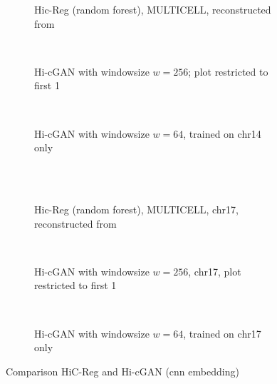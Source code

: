 \begin{figure}[htbp]
\begin{subfigure}{\textwidth}
 \centering
 \caption{Hic-Reg (random forest), MULTICELL, reconstructed from \cite{Zhang2019}} \label{fig:results:zhang-vs-ours_matrices_multicell-14}
\end{subfigure}\\[5mm]
\begin{subfigure}{\textwidth}
 \centering
 \caption{Hi-cGAN with windowsize $w=256$; plot restricted to first \SI{1}{\mega\bp}} \label{fig:results:zhang-vs-ours_matrices_ours-full-14}
\end{subfigure}\\[5mm]
\begin{subfigure}{\textwidth}
 \centering
 \caption{Hi-cGAN with windowsize $w=64$, trained on chr14 only} \label{fig:results:zhang-vs-ours_matrices_ours-only-14}
\end{subfigure}\\[4mm]
    \\[5mm]
    \begin{subfigure}{\textwidth}
 \centering
 \caption{Hic-Reg (random forest), MULTICELL, chr17, reconstructed from \cite{Zhang2019}} \label{fig:results:zhang-vs-ours_matrices_multicell-17}
\end{subfigure}\\[5mm]
\begin{subfigure}{\textwidth}
 \centering
 \caption{Hi-cGAN with windowsize $w=256$, chr17, plot restricted to first \SI{1}{\mega\bp}}\label{fig:results:zhang-vs-ours_matrices_ours-full-17}
\end{subfigure}\\[5mm]
\begin{subfigure}{\textwidth}
 \centering
 \caption{Hi-cGAN with windowsize $w=64$, trained on chr17 only} \label{fig:results:zhang-vs-ours_matrices_ours-only-17}
\end{subfigure}
\caption{Comparison HiC-Reg \cite{Zhang2019} and Hi-cGAN (\acrshort{cnn} embedding)} \label{fig:results:zhang-vs-ours_matrices}
\end{figure}

